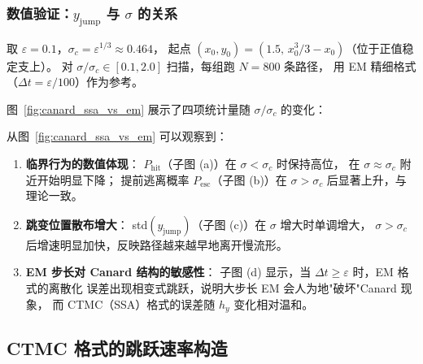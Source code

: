 \subsubsection{数值验证：$y_\mathrm{jump}$ 与 $\sigma$ 的关系}

取 $\varepsilon = 0.1$，$\sigma_c = \varepsilon^{1/3} \approx 0.464$，
起点 $(x_0, y_0) = (1.5,\, x_0^3/3 - x_0)$（位于正值稳定支上）。
对 $\sigma/\sigma_c \in [0.1, 2.0]$ 扫描，每组跑 $N=800$ 条路径，
用 EM 精细格式（$\Delta t = \varepsilon/100$）作为参考。

图~\ref{fig:canard_ssa_vs_em} 展示了四项统计量随 $\sigma/\sigma_c$ 的变化：


从图~\ref{fig:canard_ssa_vs_em} 可以观察到：

\begin{enumerate}
	\item \textbf{临界行为的数值体现}：
	$P_\mathrm{hit}$（子图 (a)）在 $\sigma < \sigma_c$ 时保持高位，
	在 $\sigma \approx \sigma_c$ 附近开始明显下降；
	提前逃离概率 $P_\mathrm{esc}$（子图 (b)）在 $\sigma > \sigma_c$
	后显著上升，与理论一致。
	
	\item \textbf{跳变位置散布增大}：
	std$(y_\mathrm{jump})$（子图 (c)）在 $\sigma$ 增大时单调增大，
	$\sigma > \sigma_c$ 后增速明显加快，反映路径越来越早地离开慢流形。
	
	\item \textbf{EM 步长对 Canard 结构的敏感性}：
	子图 (d) 显示，当 $\Delta t \geq \varepsilon$ 时，EM 格式的离散化
	误差出现相变式跳跃，说明大步长 EM 会人为地"破坏"Canard 现象，
	而 CTMC（SSA）格式的误差随 $h_y$ 变化相对温和。
\end{enumerate}

\subsection{CTMC 格式的跳跃速率构造}
\label{subsec:jump-rates}

